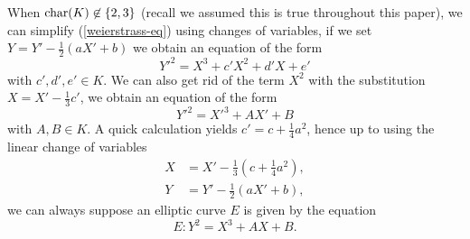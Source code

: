 When $\operatorname{char}(K) \not\in \{2, 3\}$ (recall we assumed this is true throughout this
paper), we can simplify (\ref{weierstrass-eq}) using changes of variables,
if we set $Y = Y' - \frac{1}{2}(aX'  + b)$ we obtain an equation of the form
\begin{equation*}
	Y'^2 = X^3 + c'X^2 + d'X + e'
\end{equation*}
with $c', d', e' \in K$. We can also get rid of the term $X^2$ with the
substitution $X = X' - \frac{1}{3}c'$, we obtain an equation of the form
\begin{equation*}
	Y'^2 = X'^3 + AX' + B
\end{equation*}
with $A, B \in K$. A quick calculation yields $c' = c + \frac{1}{4}a^2$,
hence up to using the linear change of variables
\begin{align*}
	X &= X' - \frac{1}{3}\left(c  + \frac{1}{4}a^2\right),\\
	Y &= Y' - \frac{1}{2}(aX'  + b),
\end{align*}
we can always suppose an elliptic curve $E$ is given by the equation
\begin{equation*}
	E: Y^2 = X^3 + AX + B.
\end{equation*}


